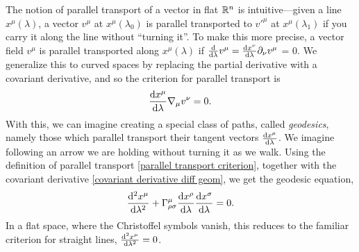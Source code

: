 The notion of parallel transport of a vector in flat $\mathbb{R}^n$ is intuitive---given a line $x^\mu(\lambda)$, a vector $v^\mu$ at $x^\mu(\lambda_0)$ is parallel transported to $v'^\mu$ at $x^\mu(\lambda_1)$ if you carry it along the line without ``turning it''.
To make this more precise, a vector field $v^\mu$ is parallel transported along $x^\mu(\lambda)$ if $\odv{}{\lambda} v^\mu = \odv{x^\nu}{\lambda} \partial_\nu v^\mu$ = 0.
We generalize this to curved spaces by replacing the partial derivative with a covariant derivative, and so the criterion for parallel transport is
%
\begin{equation}
    \label{parallel transport criterion}
    \odv{x^\mu}{\lambda} \nabla_\mu v^\nu = 0.
\end{equation}
%
With this, we can imagine creating a special class of paths, called \emph{geodesics}, namely those which parallel transport their tangent vectors $\odv{x^\mu}{\lambda}$.
We imagine following an arrow we are holding without turning it as we walk.
Using the definition of parallel transport \autoref{parallel transport criterion}, together with the covariant derivative \autoref{covariant derivative diff geom}, we get the geodesic equation,
%
\begin{equation}
    \label{goedesic equation}
    \odv[2]{x^\mu}{\lambda} 
    + \Gamma^\mu_{\rho \sigma} \odv{x^\rho}{\lambda} \odv{x^\sigma}{\lambda}
    = 0.
\end{equation}
In a flat space, where the Christoffel symbols vanish, this reduces to the familiar criterion for straight lines, $\odv[2]{x^\mu}{\lambda} = 0$.

